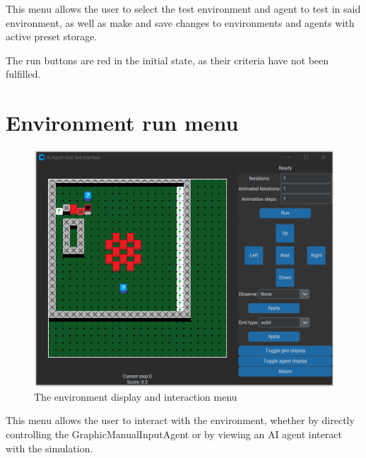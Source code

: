\documentclass[masterthesis]{fer}
\begin{document}
This menu allows the user to select the test environment and agent to test in said environment, as well as make and save changes to environments and agents with active preset storage.

The run buttons are red in the initial state, as their criteria have not been fulfilled.

\section{Environment run menu}
\begin{figure}[htb]
  \centering
  \includegraphics[width=0.5\linewidth]{Figures/thesis run.png} 
  \caption{The environment display and interaction menu}
  \label{slk:thesis_run}
\end{figure}

This menu allows the user to interact with the environment, whether by directly controlling the GraphicManualInputAgent or by viewing an AI agent interact with the simulation.
\end{document}
